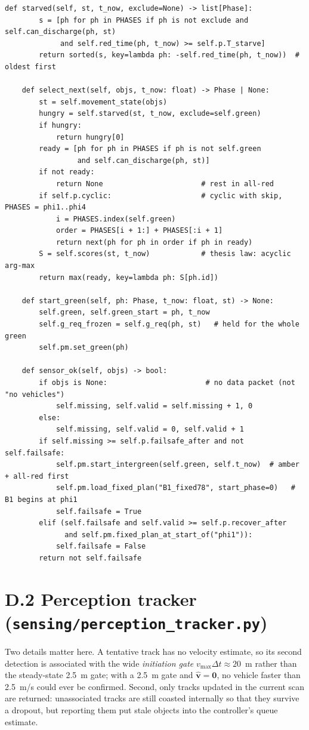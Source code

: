 \begin{lstlisting}[style=py,caption={\texttt{PrismController}: state, phase selection and fail-safe},label={lst:app-prism}]
    def starved(self, st, t_now, exclude=None) -> list[Phase]:
        s = [ph for ph in PHASES if ph is not exclude and self.can_discharge(ph, st)
             and self.red_time(ph, t_now) >= self.p.T_starve]
        return sorted(s, key=lambda ph: -self.red_time(ph, t_now))  # oldest first

    def select_next(self, objs, t_now: float) -> Phase | None:
        st = self.movement_state(objs)
        hungry = self.starved(st, t_now, exclude=self.green)
        if hungry:
            return hungry[0]
        ready = [ph for ph in PHASES if ph is not self.green
                 and self.can_discharge(ph, st)]
        if not ready:
            return None                       # rest in all-red
        if self.p.cyclic:                     # cyclic with skip, PHASES = phi1..phi4
            i = PHASES.index(self.green)
            order = PHASES[i + 1:] + PHASES[:i + 1]
            return next(ph for ph in order if ph in ready)
        S = self.scores(st, t_now)            # thesis law: acyclic arg-max
        return max(ready, key=lambda ph: S[ph.id])

    def start_green(self, ph: Phase, t_now: float, st) -> None:
        self.green, self.green_start = ph, t_now
        self.g_req_frozen = self.g_req(ph, st)   # held for the whole green
        self.pm.set_green(ph)

    def sensor_ok(self, objs) -> bool:
        if objs is None:                       # no data packet (not "no vehicles")
            self.missing, self.valid = self.missing + 1, 0
        else:
            self.missing, self.valid = 0, self.valid + 1
        if self.missing >= self.p.failsafe_after and not self.failsafe:
            self.pm.start_intergreen(self.green, self.t_now)  # amber + all-red first
            self.pm.load_fixed_plan("B1_fixed78", start_phase=0)   # B1 begins at phi1
            self.failsafe = True
        elif (self.failsafe and self.valid >= self.p.recover_after
              and self.pm.fixed_plan_at_start_of("phi1")):
            self.failsafe = False
        return not self.failsafe
\end{lstlisting}

\section*{D.2 Perception tracker (\texttt{sensing/perception\_tracker.py})}

Two details matter here. A tentative track has no velocity estimate, so its second detection is associated
with the wide \emph{initiation gate} $v_{\max}\Delta t \approx 20$~m rather than the steady-state 2.5~m gate;
with a 2.5~m gate and $\hat{\mathbf{v}} = \mathbf{0}$, no vehicle faster than 2.5~m/s could ever be confirmed.
Second, only tracks updated in the current scan are returned: unassociated tracks are still coasted
internally so that they survive a dropout, but reporting them put stale objects into the controller's queue
estimate.

